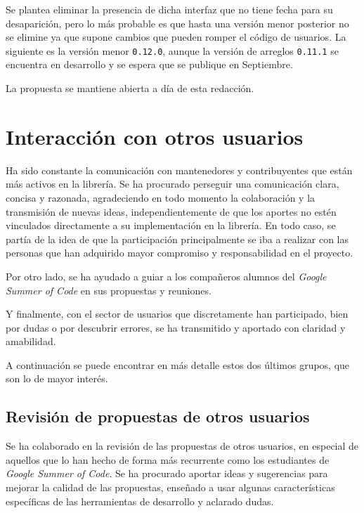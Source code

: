 Se plantea eliminar la presencia de dicha interfaz que no tiene fecha para su desaparición, pero lo más probable es que hasta una versión menor posterior no se elimine ya que supone cambios que pueden romper el código de usuarios. La siguiente es la versión menor \texttt{0.12.0}, aunque la versión de arreglos \texttt{0.11.1} se encuentra en desarrollo y se espera que se publique en Septiembre.

La propuesta se mantiene abierta a día de esta redacción.



\section{Interacción con otros usuarios}

Ha sido constante la comunicación con mantenedores y contribuyentes que están más activos en la librería. Se ha procurado perseguir una comunicación clara, concisa y razonada, agradeciendo en todo momento la colaboración y la transmisión de nuevas ideas, independientemente de que los aportes no estén vinculados directamente a su implementación en la librería. En todo caso, se partía de la idea de que la participación principalmente se iba a realizar con las personas que han adquirido mayor compromiso y responsabilidad en el proyecto.

Por otro lado, se ha ayudado a guiar a los compañeros alumnos del \textit{Google Summer of Code} en sus propuestas y reuniones.

Y finalmente, con el sector de usuarios que discretamente han participado, bien por dudas o por descubrir errores, se ha transmitido y aportado con claridad y amabilidad.

A continuación se puede encontrar en más detalle estos dos últimos grupos, que son lo de mayor interés.

\subsection{Revisión de propuestas de otros usuarios}

Se ha colaborado en la revisión de las propuestas de otros usuarios, en especial de aquellos que lo han hecho de forma más recurrente como los estudiantes de \textit{Google Summer of Code}. Se ha procurado aportar ideas y sugerencias para mejorar la calidad de las propuestas, enseñado a usar algunas características específicas de las herramientas de desarrollo y aclarado dudas.

